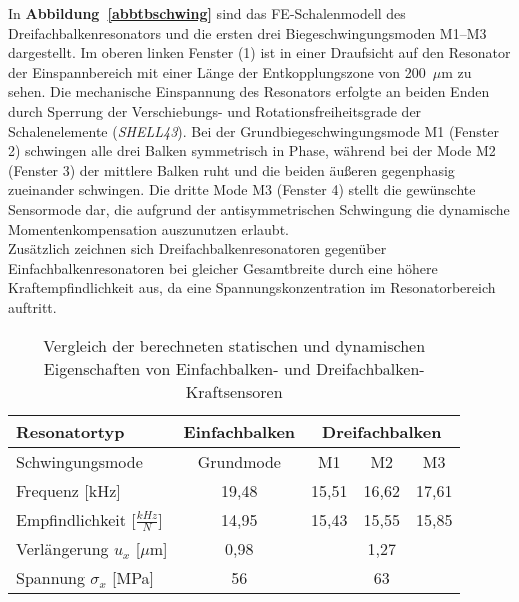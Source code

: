 
In {\bf Abbildung~\ref{abbtbschwing}} sind
das FE-Schalenmodell des Dreifachbalkenresonators und die ersten drei
Biegeschwingungsmoden M1--M3 dargestellt. Im oberen linken Fenster (1) ist
in einer Draufsicht auf den Resonator der Einspannbereich mit einer Länge der
Entkopplungszone von 200~$\mu$m zu sehen. Die mechanische Einspannung
des Resonators erfolgte an beiden Enden durch Sperrung der Verschiebungs-
und Rotationsfreiheitsgrade der Schalenelemente ({\em SHELL43}).
Bei der Grundbiegeschwingungsmode M1 (Fenster 2) schwingen alle drei Balken
symmetrisch in Phase, während bei der Mode M2 (Fenster 3) der mittlere Balken
ruht und die beiden äußeren gegenphasig zueinander schwingen. Die dritte
Mode M3 (Fenster 4) stellt die gewünschte Sensormode dar, die aufgrund der
antisymmetrischen Schwingung die dynamische Momentenkompensation auszunutzen
erlaubt. \\
%
Zusätzlich zeichnen sich Dreifachbalkenresonatoren gegenüber
Einfachbalkenresonatoren bei gleicher Gesamtbreite durch eine höhere
Kraftempfindlichkeit aus, da eine Spannungskonzentration im
Resonatorbereich auftritt.
%
%
\begin{table}[htb]
\caption{\label{tabtriple}
 Vergleich der berechneten statischen und dynamischen Eigenschaften von
 Einfachbalken- und Dreifachbalken-Kraftsensoren}
\begin{center}
\begin{tabular}{|l||c||c|c|c|}
\hline
 Resonatortyp & Einfachbalken & \multicolumn{3}{c|}{Dreifachbalken} \\
\hline
 Schwingungsmode & Grundmode & M1 & M2 & M3 \\
\hline \hline
 Frequenz [kHz] & 19,48 & 15,51 & 16,62 & 17,61 \\
\hline
 Empfindlichkeit [$\frac{kHz}{N}$] & 14,95 & 15,43 & 15,55 & 15,85 \\
\hline
 Verlängerung $u_{x}$ [$\mu$m] & 0,98 & \multicolumn{3}{c|}{1,27} \\
\hline
 Spannung $\sigma_{x}$ [MPa] & 56  & \multicolumn{3}{c|}{63} \\
\hline
\end{tabular}
\end{center}
\end{table}
